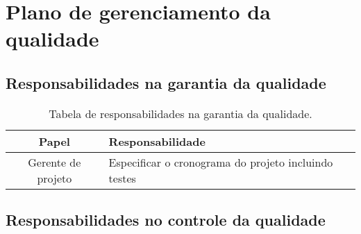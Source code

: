 
\chapter{Plano de gerenciamento da qualidade}

\section{Responsabilidades na garantia da qualidade}


\begin{table}[H]
	\begin{tabularx}{\textwidth}{| c | X |}
		\hline
		\textbf{Papel}     & \textbf{Responsabilidade}                            \\
		\hline
		Gerente de projeto & Especificar o cronograma do projeto incluindo testes \\
		\hline
	\end{tabularx}
	\centering
    \caption{Tabela de responsabilidades na garantia da qualidade.}
\end{table}

\section{Responsabilidades no controle da qualidade}


